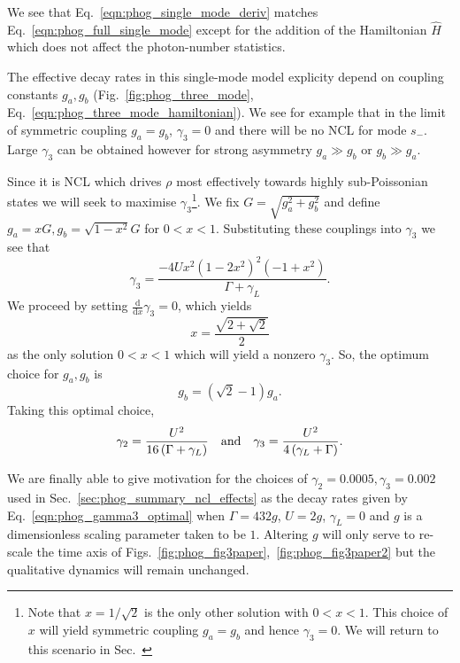 \noindent We see that Eq.~\ref{eqn:phog_single_mode_deriv} matches Eq.~\ref{eqn:phog_full_single_mode} except for the addition of the Hamiltonian $\hat{H}$ which does not affect the photon-number statistics. 



The effective decay rates in this single-mode model explicity depend on coupling constants $g_a, g_b$ (Fig.~\ref{fig:phog_three_mode}, Eq.~\ref{eqn:phog_three_mode_hamiltonian}). We see for example that in the limit of symmetric coupling $g_a = g_b$, $\gamma_3 = 0$ and there will be no NCL for mode $s_-$. Large $\gamma_3$ can be obtained however for strong asymmetry $g_a \gg g_b$ or $g_b \gg g_a$. 

Since it is NCL which drives $\rho$ most effectively towards highly sub-Poissonian states we will seek to maximise $\gamma_3$\footnote{Note that $x = 1/\sqrt{2}$ is the only other solution with $0 < x < 1$. This choice of $x$ will yield symmetric coupling $g_a = g_b$ and hence $\gamma_3=0$. We will return to this scenario in Sec.~}. We fix $G = \sqrt{g_a^2 + g_b^2}$ and define $g_a = x G, g_b = \sqrt{1-x^2}G$ for $0 < x < 1$. Substituting these couplings into $\gamma_3$ we see that
\begin{equation}
\gamma_3 = \frac{- 4 U x^2 \left(1 - 2 x^2\right)^2 \left(-1 + x^2\right)}{\Gamma + \gamma_L}.
\end{equation}
We proceed by setting $\frac{\mathrm{d}}{\mathrm{d}x} \gamma_3 = 0$, which yields
\begin{equation}
x = \frac{\sqrt{2 + \sqrt{2}}}{2}
\end{equation}
as the only solution $0 < x < 1$ which will yield a nonzero $\gamma_3$. So, the optimum choice for $g_a, g_b$ is
\begin{equation}\label{eqn:phog_gagb_optimal}
g_b = \left(\sqrt{2} - 1\right)g_a.
\end{equation}
Taking this optimal choice,
\begin{equation}\label{eqn:phog_gamma3_optimal}
\gamma_2 = \frac{U^2}{16\left(\Gamma + \gamma_L\right)} \qq{and} \gamma_3 = \frac{U^2}{4 \left(\gamma_L + \Gamma\right)}.
\end{equation}


\noindent We are finally able to give motivation for the choices of $\gamma_2=0.0005, \gamma_3=0.002$ used in Sec.~\ref{sec:phog_summary_ncl_effects} as the decay rates given by Eq.~\ref{eqn:phog_gamma3_optimal} when $\Gamma = 432 g$, $U = 2 g$, $\gamma_L = 0$ and $g$ is a dimensionless scaling parameter taken to be $1$. Altering $g$ will only serve to re-scale the time axis of Figs.~\ref{fig:phog_fig3paper},~\ref{fig:phog_fig3paper2} but the qualitative dynamics will remain unchanged. 

